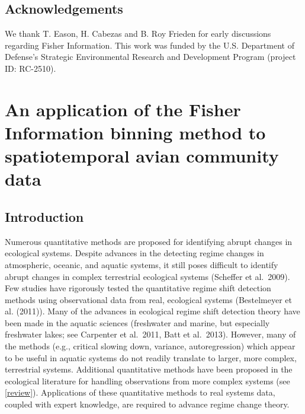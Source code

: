 \documentclass[12pt,twoside]{reedthesis}
\begin{document}
\hypertarget{acknowledgements-1}{%
\section{Acknowledgements}\label{acknowledgements-1}}

We thank T. Eason, H. Cabezas and B. Roy Frieden for early discussions regarding Fisher Information. This work was funded by the U.S. Department of Defense's Strategic Environmental Research and Development Program (project ID: RC-2510).

\hypertarget{an-application-of-the-fisher-information-binning-method-to-spatiotemporal-avian-community-data}{%
\chapter{An application of the Fisher Information binning method to spatiotemporal avian community data}\label{an-application-of-the-fisher-information-binning-method-to-spatiotemporal-avian-community-data}}

\hypertarget{introduction-2}{%
\section{Introduction}\label{introduction-2}}

Numerous quantitative methods are proposed for identifying abrupt changes in ecological systems. Despite advances in the detecting regime changes in atmospheric, oceanic, and aquatic systems, it still poses difficult to identify abrupt changes in complex terrestrial ecological systems (Scheffer et al.~2009). Few studies have rigorously tested the quantitative regime shift detection methods using observational data from real, ecological systems (Bestelmeyer et al. (2011)). Many of the advances in ecological regime shift detection theory have been made in the aquatic sciences (freshwater and marine, but especially freshwater lakes; see Carpenter et al.~2011, Batt et al.~2013). However, many of the methods (e.g., critical slowing down, variance, autoregression) which appear to be useful in aquatic systems do not readily translate to larger, more complex, terrestrial systems. Additional quantitative methods have been proposed in the ecological literature for handling observations from more complex systems (see \ref{review}). Applications of these quantitative methods to real systems data, coupled with expert knowledge, are required to advance regime change theory.
\end{document}
